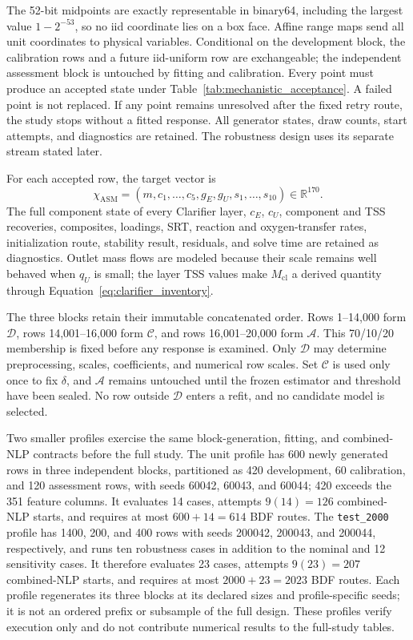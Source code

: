 \documentclass[a4paper,fleqn]{cas-sc}
\newcommand{\R}{\mathbb{R}}
\begin{document}
The 52-bit midpoints are exactly representable in binary64, including the largest value $1-2^{-53}$, so no iid coordinate lies on a box face. Affine range maps send all unit coordinates to physical variables. Conditional on the development block, the calibration rows and a future iid-uniform row are exchangeable; the independent assessment block is untouched by fitting and calibration. Every point must produce an accepted state under Table~\ref{tab:mechanistic_acceptance}. A failed point is not replaced. If any point remains unresolved after the fixed retry route, the study stops without a fitted response. All generator states, draw counts, start attempts, and diagnostics are retained. The robustness design uses its separate stream stated later.

For each accepted row, the target vector is
\begin{equation}
\label{eq:mechanistic_target}
\chi_{\mathrm{ASM}}=
(m,c_1,\ldots,c_5,g_E,g_U,s_1,\ldots,s_{10})\in\R^{170}.
\end{equation}
The full component state of every Clarifier layer, $c_E$, $c_U$, component and TSS recoveries, composites, loadings, SRT, reaction and oxygen-transfer rates, initialization route, stability result, residuals, and solve time are retained as diagnostics. Outlet mass flows are modeled because their scale remains well behaved when $q_U$ is small; the layer TSS values make $M_{\mathrm{cl}}$ a derived quantity through Equation~\eqref{eq:clarifier_inventory}.

The three blocks retain their immutable concatenated order. Rows 1--14,000 form $\mathcal D$, rows 14,001--16,000 form $\mathcal C$, and rows 16,001--20,000 form $\mathcal A$. This 70/10/20 membership is fixed before any response is examined. Only $\mathcal D$ may determine preprocessing, scales, coefficients, and numerical row scales. Set $\mathcal C$ is used only once to fix $\delta$, and $\mathcal A$ remains untouched until the frozen estimator and threshold have been sealed. No row outside $\mathcal D$ enters a refit, and no candidate model is selected.

Two smaller profiles exercise the same block-generation, fitting, and combined-NLP contracts before the full study. The unit profile has 600 newly generated rows in three independent blocks, partitioned as 420 development, 60 calibration, and 120 assessment rows, with seeds 60042, 60043, and 60044; 420 exceeds the 351 feature columns. It evaluates 14 cases, attempts $9(14)=126$ combined-NLP starts, and requires at most $600+14=614$ BDF routes. The \texttt{test\_2000} profile has 1400, 200, and 400 rows with seeds 200042, 200043, and 200044, respectively, and runs ten robustness cases in addition to the nominal and 12 sensitivity cases. It therefore evaluates 23 cases, attempts $9(23)=207$ combined-NLP starts, and requires at most $2000+23=2023$ BDF routes. Each profile regenerates its three blocks at its declared sizes and profile-specific seeds; it is not an ordered prefix or subsample of the full design. These profiles verify execution only and do not contribute numerical results to the full-study tables.
\end{document}
